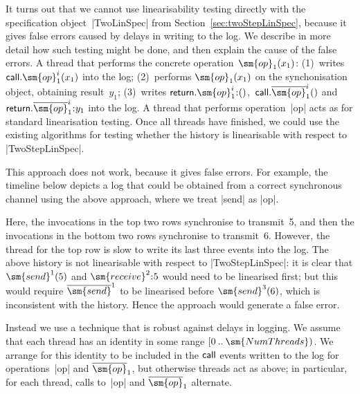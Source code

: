 It turns out that we cannot use linearisability testing directly with the
specification object~|TwoLinSpec| from Section~\ref{sec:twoStepLinSpec},
because it gives false errors caused by delays in writing to the log.  We
describe in more detail how such testing might be done, and then explain the
cause of the false errors.  A thread that performs the concrete
operation~$\sm{op}_1(x_1)$: (1)~writes $\call.\sm{op}_1^i(x_1)$ into the log;
(2)~performs $\sm{op}_1(x_1)$ on the synchonisation object, obtaining
result~$y_1$; (3)~writes $\return.\sm{op}_1^i \:: ()$,\,
$\call.\overline{\sm{op}}_1^i()$ and $\return.\overline{\sm{op}}_1^i \:: y_1$
into the log.  A thread that performs operation~|op| acts as for standard
linearisation testing.  Once all threads have finished, we could use the
existing algorithms for testing whether the history is linearisable with
respect to |TwoStepLinSpec|.

This approach does not work, because it gives false errors.  For example, the
timeline below depicts a log that could be obtained from a correct synchronous
channel using the above approach, where we treat |send| as |op|.
%
\begin{center}
\unScalaMid
{}
\scalaMid
\end{center}
%
Here, the invocations in the top two rows synchronise to transmit~5, and then
the invocations in the bottom two rows synchronise to transmit~6.  However,
the thread for the top row is slow to write its last three events into the
log.  The above history is not linearisable with respect to |TwoStepLinSpec|:
it is clear that $\sm{send}^1(5)$ and $\sm{receive}^2 \:: 5$ would need to be
linearised first; but this would require $\overline{\sm{send}}^1$ to be
linearised before $\sm{send}^3(6)$, which is inconsistent with the history.
Hence the approach would generate a false error.

Instead we use a technique that is robust against delays in logging.  We
assume that each thread has an identity in some range $\range 0
{\sm{NumThreads}}$.  We arrange for this identity to be included in the
$\mathsf{call}$ events written to the log for operations~|op| and
$\overline{\sm{op}}_1$, but otherwise threads act as above; in particular, for
each thread, calls to~|op| and $\overline{\sm{op}}_1$ alternate.

